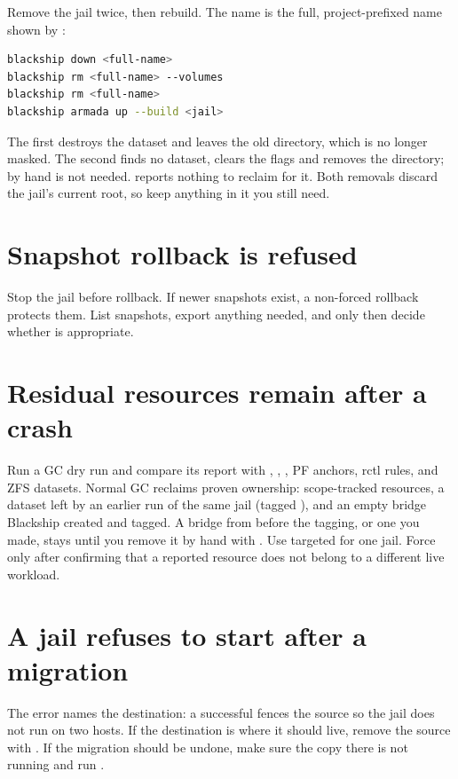 Remove the jail twice, then rebuild. The name is the full, project-prefixed
name shown by :

\begin{lstlisting}[language=bash]
blackship down <full-name>
blackship rm <full-name> --volumes
blackship rm <full-name>
blackship armada up --build <jail>
\end{lstlisting}

The first  destroys the dataset and leaves the old directory,
which is no longer masked. The second finds no dataset, clears the flags
and removes the directory;  by hand is not needed.
 reports nothing to reclaim for it. Both removals discard the
jail's current root, so keep anything in it you still need.

\section{Snapshot rollback is refused}

Stop the jail before rollback. If newer snapshots exist, a non-forced rollback
protects them. List snapshots, export anything needed, and only then decide
whether  is appropriate.

\section{Residual resources remain after a crash}

Run a GC dry run and compare its report with , ,
, PF anchors, rctl rules, and ZFS datasets.
Normal GC reclaims proven ownership: scope-tracked resources, a dataset left by
an earlier run of the same jail (tagged ), and an
empty bridge Blackship created and tagged. A bridge from before the tagging, or
one you made, stays until you remove it by hand with
. Use targeted  for one
jail. Force only after confirming that a reported resource does not belong to a
different live workload.

\section{A jail refuses to start after a migration}

The error names the destination: a successful  fences the
source so the jail does not run on two hosts. If the destination is where it
should live, remove the source with . If the
migration should be undone, make sure the copy there is not running and run
.

